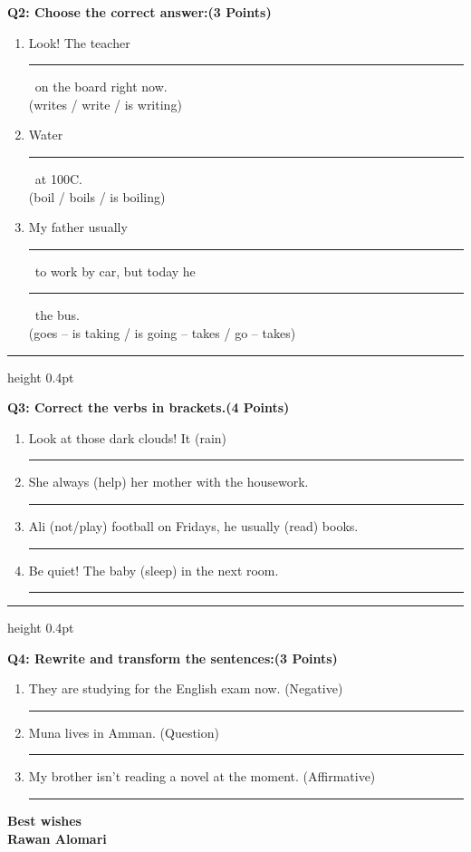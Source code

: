 \documentclass[12pt, a4paper]{article}
\newcommand{\ansline}{\par\vspace{0.45cm}\noindent\rule{\linewidth}{0.4pt}\par}
\newcommand{\blank}[1][3cm]{\rule{#1}{0.4pt}}
\newcommand{\question}[2]{\par\vspace{0.4cm}\noindent\textbf{\large #1}\hfill\textbf{(#2)}\par\vspace{0.2cm}}
\begin{document}
\newpage
\question{Q2: Choose the correct answer:}{3 Points}

\begin{enumerate}[label=\textbf{\arabic*.}, itemsep=0.45cm, leftmargin=*]
\item Look! The teacher \blank\ on the board right now. \\
(writes / write / is writing)

\item Water \blank\ at 100\degree C. \\
(boil / boils / is boiling)

\item My father usually \blank\ to work by car, but today he \blank\ the bus. \\
(goes -- is taking / is going -- takes / go -- takes)
\end{enumerate}

\vspace{0.2cm}
\hrule height 0.4pt

\question{Q3: Correct the verbs in brackets.}{4 Points}

\begin{enumerate}[label=\textbf{\arabic*.}, itemsep=0.35cm, leftmargin=*]
\item Look at those dark clouds! It (rain) \blank[5cm]

\item She always (help) her mother with the housework.
\ansline

\item Ali (not/play) football on Fridays, he usually (read) books.
\ansline

\item Be quiet! The baby (sleep) in the next room.
\ansline
\end{enumerate}

\vspace{0.2cm}
\hrule height 0.4pt

\question{Q4: Rewrite and transform the sentences:}{3 Points}

\begin{enumerate}[label=\textbf{\arabic*.}, itemsep=0.35cm, leftmargin=*]
\item They are studying for the English exam now. \hfill (Negative)
\ansline

\item Muna lives in Amman. \hfill (Question)
\ansline

\item My brother isn't reading a novel at the moment. \hfill (Affirmative)
\ansline
\end{enumerate}

\vspace{1.2cm}
\begin{center}
\textbf{\large Best wishes} \\[0.3cm]
\textbf{Rawan Alomari}
\end{center}
\end{document}
